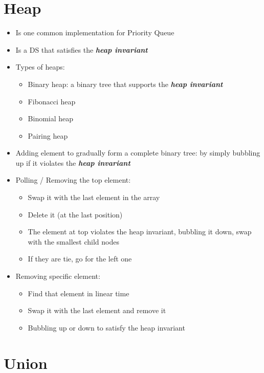\section{Heap}
\begin{itemize}
	\item Is one common implementation for Priority Queue
	\item Is a \ac{DS} that satisfies the \textit{\textbf{heap invariant}}
	\item Types of heaps:
	\begin{itemize}
		\item Binary heap: a binary tree that supports the \textbf{\textit{heap invariant}}
		\item Fibonacci heap
		\item Binomial heap
		\item Pairing heap
	\end{itemize}
	\item Adding element to gradually form a complete binary tree: by simply bubbling up if it violates the \textbf{\textit{heap invariant}}
	\item Polling / Removing the top element:
	\begin{itemize}
		\item Swap it with the last element in the array
		\item Delete it (at the last position)
		\item The element at top violates the heap invariant, bubbling it down, swap with the smallest child nodes
		\item If they are tie, go for the left one
	\end{itemize}
	\item Removing specific element:
	\begin{itemize}
		\item Find that element in linear time
		\item Swap it with the last element and remove it
		\item Bubbling up or down to satisfy the heap invariant
	\end{itemize}
\end{itemize}

\section{Union}

